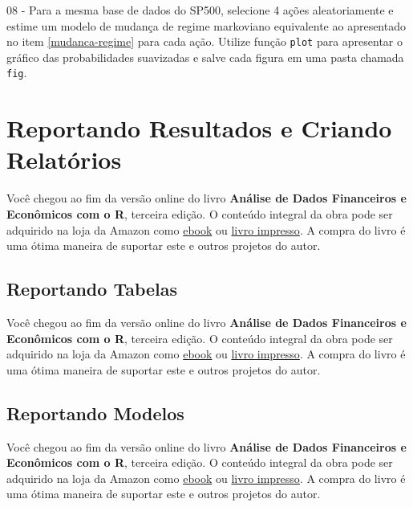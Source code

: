 \documentclass[
  11pt,
]{book}
\newenvironment{pleasebuyit}
{\begin{noteblock}
		
	} {\end{noteblock}}
\begin{document}
08 -
Para a mesma base de dados do SP500, selecione 4 ações aleatoriamente e estime um modelo de mudança de regime markoviano equivalente ao apresentado no item \ref{mudanca-regime} para cada ação. Utilize função \texttt{plot} para apresentar o gráfico das probabilidades suavizadas e salve cada figura em uma pasta chamada \texttt{\textquotesingle{}fig\textquotesingle{}}.

\hypertarget{reportando-resultados}{%
\chapter{Reportando Resultados e Criando Relatórios}\label{reportando-resultados}}

\begin{pleasebuyit}
Você chegou ao fim da versão online do livro \textbf{Análise de Dados
Financeiros e Econômicos com o R}, terceira edição. O conteúdo integral
da obra pode ser adquirido na loja da Amazon como
\href{https://www.amazon.com.br/dp/B08WNC27ZY}{ebook} ou
\href{https://www.amazon.com/dp/B08WP8CCDB}{livro impresso}. A compra do
livro é uma ótima maneira de suportar este e outros projetos do autor.
\end{pleasebuyit}

\hypertarget{reportando-tabelas}{%
\section{Reportando Tabelas}\label{reportando-tabelas}}

\begin{pleasebuyit}
Você chegou ao fim da versão online do livro \textbf{Análise de Dados
Financeiros e Econômicos com o R}, terceira edição. O conteúdo integral
da obra pode ser adquirido na loja da Amazon como
\href{https://www.amazon.com.br/dp/B08WNC27ZY}{ebook} ou
\href{https://www.amazon.com/dp/B08WP8CCDB}{livro impresso}. A compra do
livro é uma ótima maneira de suportar este e outros projetos do autor.
\end{pleasebuyit}

\hypertarget{reporting-models}{%
\section{Reportando Modelos}\label{reporting-models}}

\begin{pleasebuyit}
Você chegou ao fim da versão online do livro \textbf{Análise de Dados
Financeiros e Econômicos com o R}, terceira edição. O conteúdo integral
da obra pode ser adquirido na loja da Amazon como
\href{https://www.amazon.com.br/dp/B08WNC27ZY}{ebook} ou
\href{https://www.amazon.com/dp/B08WP8CCDB}{livro impresso}. A compra do
livro é uma ótima maneira de suportar este e outros projetos do autor.
\end{pleasebuyit}
\end{document}
